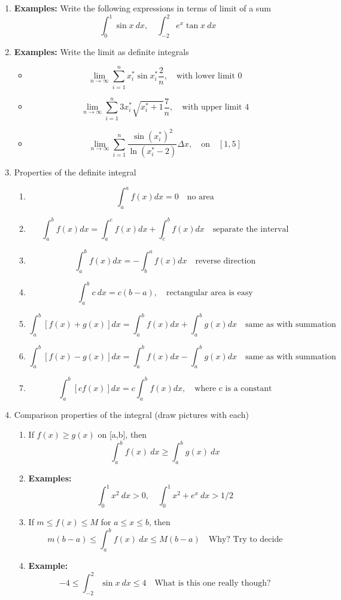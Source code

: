 \documentclass{article}
\begin{document}
\begin{enumerate}
\item {\bf Examples:} Write the following expressions in terms of limit of a sum
$$
\int_0^1 \sin x~dx, \quad \int_{-2}^2 e^x\tan x~dx
$$

\item {\bf Examples:} Write the limit as definite integrals
\begin{itemize}
\item
$$
\lim_{n\rightarrow \infty}\sum_{i=1}^n x^*_i\sin x^*_i\frac{2}{n},\quad \text{with lower limit 0}
$$
\item
$$
\lim_{n\rightarrow \infty}\sum_{i=1}^n 3x^*_i\sqrt{x^*_i+1}
\frac{7}{n},\quad \text{with upper limit 4}
$$
\item
$$
 \lim_{n\rightarrow \infty}\sum_{i=1}^n \frac{\sin (x_i^*)^2}{\ln (x_i^*-2)}\Delta x,\quad \text{on}\quad [1,5]
$$
\end{itemize}

\item Properties of the definite integral
\begin{enumerate}
\item 
$$
\int_a^a f(x)dx = 0 \quad \text{no area}
$$
\item  $$
\int_a^b f(x)dx = \int_a^c f(x)dx+\int_c^b f(x)dx \quad \text{separate the interval}
$$
\item 
$$
\int_a^b f(x)dx = -\int_b^a f(x)dx  \quad \text{reverse direction}
$$
\item 
$$
\int_a^b c ~dx  = c(b-a),\quad\text{rectangular area is easy}
$$
\item 
$$
\int_a^b [f(x)+g(x)]dx = \int_a^b f(x)dx+\int_a^b g(x)dx  \quad \text{same as with summation}
$$
\item 
$$
\int_a^b [f(x)-g(x)]dx = \int_a^b f(x)dx-\int_a^b g(x)dx \quad \text{same as with summation}
$$
\item 
$$
\int_a^b [cf(x)]dx = c\int_a^b f(x)dx,\quad\text{where c is a constant}
$$
\end{enumerate}

\item Comparison properties of the integral (draw pictures with each)
\begin{enumerate}
\item If $f(x)\geq g(x)$ on [a,b], then 
$$
\int_a^b f(x)~dx \geq \int_a^b g(x)~dx
$$
\item {\bf Examples:}
$$
\int_0^1 x^2 ~dx>0,\quad \int_0^1 x^2+e^x ~dx>1/2
$$
\item If $m\leq f(x)\leq M$ for $a\leq x\leq b$, then
$$
m(b-a)\leq \int_a^b f(x)~dx \leq M(b-a) \quad \text{Why? Try to decide}
$$
\item {\bf Example:}
$$
-4\leq \int_{-2}^2 \sin x ~dx \leq 4 \quad \text{What is this one really though?}
$$
\end{enumerate}


\end{enumerate}
\end{document}
